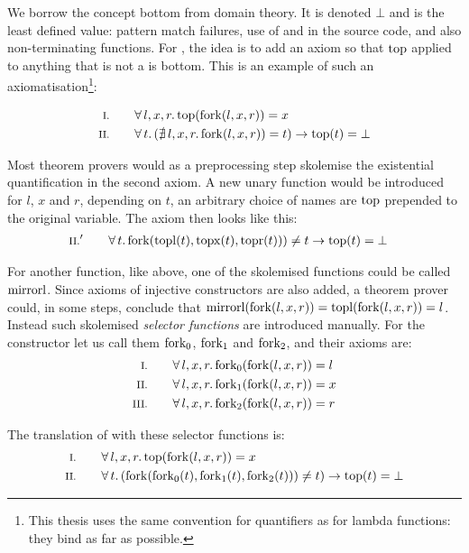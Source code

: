 We borrow the concept bottom from domain theory. It is denoted
$\bot$ and is the least defined value: pattern match failures, use of
 and  in the source code, and also
non-terminating functions. For , the idea is to add an axiom
so that $\mathrm{top}$ applied to anything that is not a  is
bottom. This is an example of such an axiomatisation\footnote{This
  thesis uses the same convention for quantifiers as for lambda
  functions: they bind as far as possible.}:

\begin{align*}
\rom{1} \qquad & \faaa{l}{x}{r} \fn{top}(\fn{fork}(l,x,r)) \eq x \\
\rom{2} \qquad & \fa{t}         (\nexxx{l}{x}{r} \fn{fork}(l,x,r)) \eq t) \rightarrow \fn{top}(t) \eq \bot
\end{align*}

Most theorem provers would as a preprocessing step skolemise the existential quantification in the second
axiom. A new unary function would be introduced for $l$, $x$ and $r$,
depending on $t$, an arbitrary choice of names are $\mathrm{top}$ prepended
to the original variable. The axiom then looks like
this:
\begin{align*}
\rom{2}' \qquad & \fa{t} \fn{fork}(\fn{topl}(t),\fn{topx}(t),\fn{topr}(t))) \neq t \rightarrow \fn{top}(t) \eq \bot
\end{align*}

For another function, like  above, one of the skolemised
functions could be called $\mathrm{mirrorl}$. Since axioms of injective
constructors are also added, a theorem prover could, in some steps,
conclude that $\mathrm{mirrorl}(\mathrm{fork}(l,x,r)) =
\mathrm{topl}(\mathrm{fork}(l,x,r)) = l$. Instead such skolemised
\emph{selector functions} are introduced manually.  For the 
constructor let us call them $\mathrm{fork_0}$, $\mathrm{fork_1}$ and
$\mathrm{fork_2}$, and their axioms are:
\begin{align*}
\rom{1} \qquad \faaa{l}{x}{r} \fn{fork_{0}}(\fn{fork}(l,x,r)) & \eq l \\
\rom{2} \qquad \faaa{l}{x}{r} \fn{fork_{1}}(\fn{fork}(l,x,r)) & \eq x \\
\rom{3} \qquad \faaa{l}{x}{r} \fn{fork_{2}}(\fn{fork}(l,x,r)) & \eq r
\end{align*}

\noindent
The translation of  with these selector functions is:
\begin{align*}
\rom{1} \qquad & \faaa{l}{x}{r} \fn{top}(\fn{fork}(l,x,r)) \eq x \\
\rom{2} \qquad & \fa{t}         (\fn{fork}(\fn{fork_0}(t),\fn{fork_1}(t),\fn{fork_2}(t))) \neq t) \rightarrow \fn{top}(t) \eq \bot
\end{align*}

